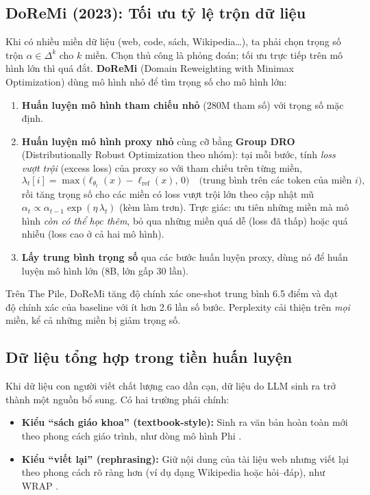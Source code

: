 \subsection{DoReMi (2023): Tối ưu tỷ lệ trộn dữ liệu}
\label{ssec:doremi}
Khi có nhiều miền dữ liệu (web, code, sách, Wikipedia\ldots), ta phải chọn trọng số trộn $\alpha \in \Delta^k$ cho $k$ miền. Chọn thủ công là phỏng đoán; tối ưu trực tiếp trên mô hình lớn thì quá đắt. \textbf{DoReMi} (Domain Reweighting with Minimax Optimization) \cite{xie2023doremi} dùng mô hình nhỏ để tìm trọng số cho mô hình lớn:
\begin{enumerate}
	\item \textbf{Huấn luyện mô hình tham chiếu nhỏ} (280M tham số) với trọng số mặc định.
	\item \textbf{Huấn luyện mô hình proxy nhỏ} cùng cỡ bằng \textbf{Group DRO} (Distributionally Robust Optimization theo nhóm): tại mỗi bước, tính \emph{loss vượt trội} (excess loss) của proxy so với tham chiếu trên từng miền,
	\[
	\lambda_t[i] = \max\Big(\ell_{\theta_t}(x) - \ell_{\text{ref}}(x),\, 0\Big) \quad \text{(trung bình trên các token của miền } i\text{)},
	\]
	rồi tăng trọng số cho các miền có loss vượt trội lớn theo cập nhật mũ $\alpha_t \propto \alpha_{t-1}\exp(\eta\,\lambda_t)$ (kèm làm trơn). Trực giác: ưu tiên những miền mà mô hình \emph{còn có thể học thêm}, bỏ qua những miền quá dễ (loss đã thấp) hoặc quá nhiễu (loss cao ở cả hai mô hình).
	\item \textbf{Lấy trung bình trọng số} qua các bước huấn luyện proxy, dùng nó để huấn luyện mô hình lớn (8B, lớn gấp 30 lần).
\end{enumerate}
Trên The Pile, DoReMi tăng độ chính xác one-shot trung bình 6.5 điểm và đạt độ chính xác của baseline với ít hơn 2.6 lần số bước. Perplexity cải thiện trên \emph{mọi} miền, kể cả những miền bị giảm trọng số.

\subsection{Dữ liệu tổng hợp trong tiền huấn luyện}
\label{ssec:synthetic_pretraining}
Khi dữ liệu con người viết chất lượng cao dần cạn, dữ liệu do LLM sinh ra trở thành một nguồn bổ sung. Có hai trường phái chính:
\begin{itemize}
	\item \textbf{Kiểu “sách giáo khoa” (textbook-style):} Sinh ra văn bản hoàn toàn mới theo phong cách giáo trình, như dòng mô hình Phi \cite{gunasekar2023textbooks}.
	\item \textbf{Kiểu “viết lại” (rephrasing):} Giữ nội dung của tài liệu web nhưng viết lại theo phong cách rõ ràng hơn (ví dụ dạng Wikipedia hoặc hỏi--đáp), như WRAP \cite{maini2024wrap}.
\end{itemize}

